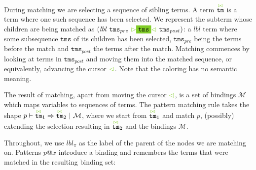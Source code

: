 \documentclass{article}
\makeatletter
\newcommand{\cursorColor}{LimeGreen}
\newcommand{\lbl}{\ensuremath{\mathit{lbl}}}
\newcommand{\tm}{\ensuremath{\mathtt{tm}}}
\newcommand{\tms}{\ensuremath{\mathtt{tms}}}
\newcommand{\Tmc}{\ensuremath{\overset{ \textcolor{\cursorColor}{\bowtie}}{\tm}}}
\newcommand{\mstart}{\ensuremath{\textcolor{\cursorColor}{\rhd}}}
\newcommand{\mend}{\ensuremath{\textcolor{\cursorColor}{\lhd}}}
\newcommand{\bindings}{\ensuremath{\mathcal{M}}}
\newcommand{\extend}[2]{\ensuremath{#1\cup #2}}
\newcommand{\select}[1]{\mstart\colorbox{\cursorColor}{$#1$}\mend}
\newcommand{\matches}[4]{\ensuremath{#1 \vdash #2 \Rightarrow #3 ~|~ #4}}
\newcommand{\pseq}[2]{\ensuremath{#1 \cdot #2}}
\newcommand{\por}[2]{\ensuremath{#1/#2}}
\newcommand{\children}[2]{\ensuremath{#1} \Downarrow #2}
\newcommand{\maybe}[1]{\ensuremath{#1?}}
\newcommand{\many}[1]{\ensuremath{#1^*}}
\newcommand{\any}{\ensuremath{\text{\underline{\hspace{0.6em}}}}}
\newcommand{\bind}[2]{\ensuremath{#1@#2}}
\newcommand{\paction}[2]{\ensuremath{#1\mathop{\circ} #2}}
\makeatother
\begin{document}
\[\begin{array}{rcl}
  \end{array}
\]
%
During matching we are selecting a sequence of sibling terms. A
term \Tmc{} is a term where one such sequence has been selected.
We represent the subterm whose children are being matched as
$(\lbl~\tms_{pre}~\select{\tms}~\tms_{post})$: a $\lbl$ term
where some subsequence $\tms$ of its children has been selected,
$\tms_{pre}$ being the terms before the match and $\tms_{post}$
the terms after the match. Matching commences by looking at terms
in $\tms_{post}$ and moving them into the matched sequence, or
equivalently, advancing the cursor $\mend$. Note that the coloring
has no semantic meaning.

The result of matching, apart from moving the cursor $\mend$, is a
set of bindings $\bindings$ which maps variables to sequences of
terms.
%
%
%
%
The pattern matching rule takes the shape
$\matches{p}{\Tmc_1}{\Tmc_2}{\bindings}$, where we start from
$\Tmc_1$ and match $p$, (possibly) extending the selection
resulting in $\Tmc_2$ and the bindings $\bindings$.

Throughout, we use $\lbl_\pi$ as the label of the parent of the
nodes we are matching on.
%
Patterns $\bind{p}{x}$ introduce a binding and remembers the terms
that were matched in the resulting binding set:
\end{document}
